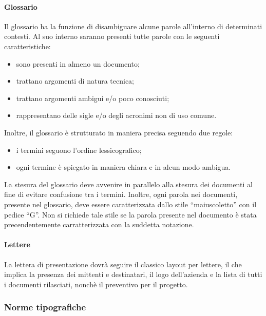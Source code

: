 			\paragraph{Glossario}
				Il glossario ha la funzione di disambiguare alcune parole all'interno di determinati contesti. Al suo interno saranno presenti tutte parole con le seguenti caratteristiche:
				\begin{itemize}
					\item sono presenti in almeno un documento;
					\item trattano argomenti di natura tecnica;
					\item trattano argomenti ambigui e/o poco conosciuti;
					\item rappresentano delle sigle e/o degli acronimi non di uso comune.
				\end{itemize}
				Inoltre, il glossario è strutturato in maniera precisa seguendo due regole:
				\begin{itemize}
					\item i termini seguono l'ordine lessicografico;
					\item ogni termine è spiegato in maniera chiara e in alcun modo ambigua.
				\end{itemize}
				La stesura del glossario deve avvenire in parallelo alla stesura dei documenti al fine di evitare confusione tra i termini. Inoltre, ogni parola nei documenti, presente nel glossario, deve essere caratterizzata dallo stile ``maiuscoletto'' con il pedice ``G''. Non si richiede tale stile se la parola presente nel documento è stata precendentemente carratterizzata con la suddetta notazione.
			\paragraph{Lettere}
				La lettera di presentazione dovrà seguire il classico layout per lettere, il che implica la presenza dei mittenti e destinatari, il logo dell'azienda e la lista di tutti i documenti rilasciati, nonchè il preventivo per il progetto.
		\subsubsection{Norme tipografiche}
